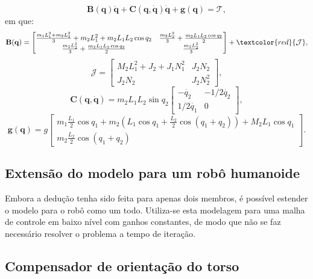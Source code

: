 \begin{equation}
\label{eq:dinamica}
\mathbf{B(q)} \ddot{\mathbf{q}} + \mathbf{C}(\mathbf{q}, \dot{\mathbf{q}}) \dot{\mathbf{q}} + \mathbf{g(q)} = \mathbf{\mathcal{T}},
\end{equation}
em que:
\begin{equation}
\label{eq:bq}
\mathbf{B}(\mathbf{q}) = \begin{bmatrix} \frac{m_1 L_1^2 + m_2 L_2^2}{3} + m_2 L_1^2 + m_2 L_1 L_2 \cos q_2 & \frac{m_2 L_2^2}{3}+\frac{m_2 L_1 L_2 \cos q_2}{2}\\ \frac{m_2 L_2^2}{3}+\frac{m_2 L_1 L_2 \cos q_2}{2} &\frac{m_2 L_2^2}{3} \end{bmatrix} + \textcolor{red}{\mathbf{\mathcal{J}}},
\end{equation}
\begin{equation}
\label{eq:J}
\mathbf{\mathcal{J}} = \begin{bmatrix} M_2 L_1^2 + J_2 + J_1 N_1^2 & J_2 N_2 \\ J_2 N_2 & J_2 N_2^2 \end{bmatrix},
\end{equation}
\begin{equation}
\mathbf{C}(\mathbf{q}, \dot{\mathbf{q}})=m_2 L_1 L_2 \sin q_2 \begin{bmatrix} -\dot{q_2} & -1/2 \dot{q_2} \\ 1/2 \dot{q_1} & 0 \end{bmatrix},
\end{equation}
\begin{equation}
\mathbf{g(q)} = g \begin{bmatrix} m_1 \frac{L_1}{2}\cos q_1 + m_2 \left(L_1 \cos q_1 + \frac{L_2}{2} \cos (q_1+q_2) \right) + M_2 L_1 \cos q_1 \\ m_2 \frac{L_2}{2} \cos (q_1+q_2) \end{bmatrix}.
\end{equation}
\subsection{Extensão do modelo para um robô humanoide}
Embora a dedução tenha sido feita para apenas dois membros, é possível estender o modelo para o robô como um todo. Utiliza-se esta modelagem para uma malha de controle em baixo nível com ganhos constantes, de modo que não se faz necessário resolver o problema a tempo de iteração.

\subsection{Compensador de orientação do torso}

